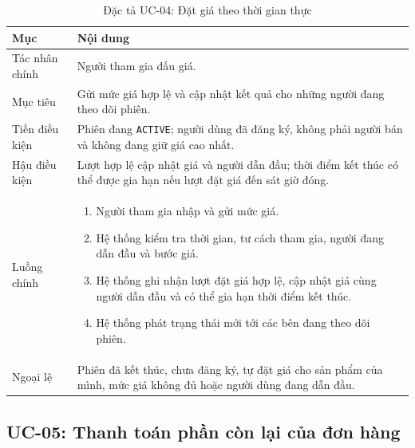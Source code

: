 \documentclass[../DoAn.tex]{subfiles}
\begin{document}
\begin{table}[H]
    \centering
    \caption{Đặc tả UC-04: Đặt giá theo thời gian thực}
    \label{tab:uc-place-bid}
    \footnotesize
    \setlength{\tabcolsep}{4pt}
    \renewcommand{\arraystretch}{1.03}
    \begin{tabular}{|>{\raggedright\arraybackslash}p{}|>{\raggedright\arraybackslash}p{}|}
        \hline
        \textbf{Mục} & \textbf{Nội dung} \\
        \hline
        Tác nhân chính & Người tham gia đấu giá. \\
        \hline
        Mục tiêu & Gửi mức giá hợp lệ và cập nhật kết quả cho những người đang theo dõi phiên. \\
        \hline
        Tiền điều kiện & Phiên đang \texttt{ACTIVE}; người dùng đã đăng ký, không phải người bán và không đang giữ giá cao nhất. \\
        \hline
        Hậu điều kiện & Lượt hợp lệ cập nhật giá và người dẫn đầu; thời điểm kết thúc có thể được gia hạn nếu lượt đặt giá đến sát giờ đóng. \\
        \hline
        Luồng chính &
        \begin{enumerate}[label=\roman*., leftmargin=*, nosep]
            \item Người tham gia nhập và gửi mức giá.
            \item Hệ thống kiểm tra thời gian, tư cách tham gia, người đang dẫn đầu và bước giá.
            \item Hệ thống ghi nhận lượt đặt giá hợp lệ, cập nhật giá cùng người dẫn đầu và có thể gia hạn thời điểm kết thúc.
            \item Hệ thống phát trạng thái mới tới các bên đang theo dõi phiên.
        \end{enumerate} \\
        \hline
        Ngoại lệ & Phiên đã kết thúc, chưa đăng ký, tự đặt giá cho sản phẩm của mình, mức giá không đủ hoặc người dùng đang dẫn đầu. \\
        \hline
    \end{tabular}
\end{table}
\FloatBarrier

\subsection{UC-05: Thanh toán phần còn lại của đơn hàng}
\end{document}
